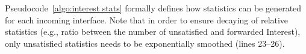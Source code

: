 




Pseudocode~\ref{algo:interest stats} formally defines how statistics can be generated for  each incoming interface. Note that in order to ensure decaying of relative statistics (e.g., ratio between the number of unsatisfied and forwarded Interest), only unsatisfied statistics needs to be exponentially smoothed (lines 23--26).  




